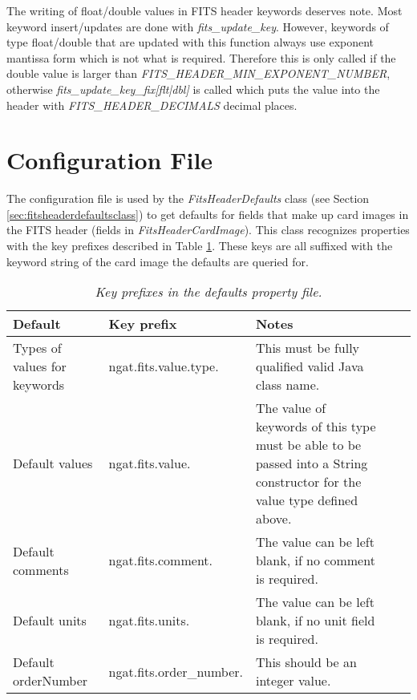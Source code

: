 \documentclass[10pt,a4paper]{article}
\begin{document}
The writing of float/double values in FITS header keywords deserves note. Most keyword insert/updates are done
with {\em fits\_update\_key}. However, keywords of type float/double that are updated with this function
always use exponent mantissa form which is not what is required. Therefore this is only called if
the double value is larger than {\em FITS\_HEADER\_MIN\_EXPONENT\_NUMBER}, otherwise 
{\em fits\_update\_key\_fix[flt|dbl]} is called which puts the value into the header with {\em FITS\_HEADER\_DECIMALS}
decimal places.

\section{Configuration File}
\label{sec:configfile}
The configuration file is used by the {\em FitsHeaderDefaults} class (see Section \ref{sec:fitsheaderdefaultsclass}) 
to get defaults for fields that make up card images in the FITS header (fields in {\em FitsHeaderCardImage}).
This class recognizes properties with the key prefixes described in Table \ref{tab:defaultkeyprefix}.
These keys are all suffixed with the keyword string of the card image the defaults are queried for.

\begin{table}
\begin{center}
\begin{tabular}{|l|l|p{12em}|l|p{17em}|}
\hline
{\bf Default} 			& {\bf Key prefix} 	& {\bf Notes} \\ \hline
Types of values for keywords	& ngat.fits.value.type. & This must be fully qualified valid Java class name. \\ \hline
Default values 			& ngat.fits.value. 	& The value of keywords of this type must be able to be 
					passed into a String constructor for the value type defined above. \\ \hline
Default comments 		& ngat.fits.comment. 	& The value can be left blank, 
							if no comment is required. \\ \hline
Default units 			& ngat.fits.units. 	& The value can be left blank, 
							if no unit field is required. \\ \hline
Default orderNumber 		& ngat.fits.order\_number. & This should be an integer value. \\ \hline
\end{tabular}
\end{center}
\caption{\em Key prefixes in the defaults property file.}
\label{tab:defaultkeyprefix} 
\end{table}
\end{document}
